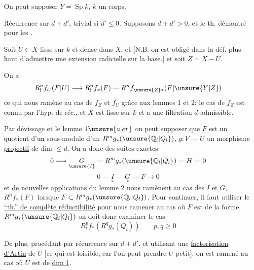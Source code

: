 On peut supposer \(Y=\operatorname{Sp}k\), \(k\) un corps.

Récurrence sur \(d+d'\), trivial si \(d'\le0\).
Supposons \(d+d'>0\), et le th. démontré pour les
 .

Soit \(U\subset X\)  lisse sur \(k\) et dense dans \(X\),
et 
[N.B. on est obligé dans la déf. plus haut d'admettre une extension radicielle sur la base.]
et soit \(Z=X-U\).

On a
\[
R^n_!f_U(F|U)\longrightarrow R^n_!f_*(F)
\mathbin{\text{---}} R^n_!f_{\unsure{Z}*}(F|\unsure{Y|Z})
\]
ce qui nous ramène au cas de \(f_Z\) et \(f_U\) grâce aux lemmes 1 et 2;
le cas de \(f_Z\) est connu par l'hyp. de réc.,
et   \(X\) est lisse
sur \(k\) et a une filtration \(d\)-admissible.

Par dévissage et le lemme \(1\unsure{a|er}\) on peut supposer que \(F\)
est un quotient  d'un
sous-module  d'un \(R^mg_*(\unsure{\mathbb Q_l|Q_l})\),
\(g:V\mathbin{\text{---}}U\) un morphisme \uline{projectif} de dim
 \(\le d\).
On a donc des suites exactes
\[
0\longrightarrow \underset{\unsure{/}}{G}\mathbin{\text{---}}
R^mg_*(\unsure{\mathbb Q_l|Q_l})\mathbin{\text{---}}H\mathbin{\text{---}}0
\]
\[
0\mathbin{\text{---}}\underset{*}{I}\mathbin{\text{---}}
\underset{*}{G}\mathbin{\text{---}}F\longrightarrow0
\]
et \uline{de} nouvelles applications du lemme 2 nous ramènent au cas des \(I\) et \(G\),
\(R^nf_*(F)\) lorsque 
\(F\)  \(\subset R^mg_*(\unsure{\mathbb Q_l|Q_l})\).
Pour continuer, il faut utiliser le
\uline{``th.'' de complète réductibilité}
pour nous ramener au cas où \(F\) est de la forme \(R^mg_*(\unsure{\mathbb Q_l|Q_l})\)
on doit donc examiner le cas
\[
R^p_!f_*(R^qg_*(Q_l))\qquad p,q\ge0
\]

De plus, procédant par récurrence sur \(d+d'\), et utilisant une
\uline{factorisation d'Artin} de \(U\)
[ce qui est loisible, car l'on peut prendre \(U\) petit],
on est ramené au cas où \(U\) est de \uline{dim 1}.

